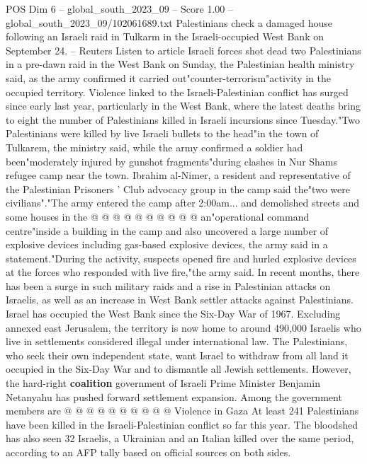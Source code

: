 \begin{textsample}{POS Dim 6 – global\_south\_2023\_09 – Score 1.00 – global\_south\_2023\_09/102061689.txt}  \label{ex:f6_pos_384}
Palestinians check a damaged house following an Israeli raid in Tulkarm in the Israeli-occupied West Bank on September 24. -- Reuters Listen to article Israeli forces shot dead two Palestinians in a pre-dawn raid in the West Bank on Sunday, the Palestinian health ministry said, as the army confirmed it carried out"counter-terrorism"activity in the occupied territory.
Violence linked to the Israeli-Palestinian conflict has surged since early last year, particularly in the West Bank, where the latest deaths bring to eight the number of Palestinians killed in Israeli incursions since Tuesday."Two Palestinians were killed by live Israeli bullets to the head"in the town of Tulkarem, the ministry said, while the army confirmed a soldier had been"moderately injured by gunshot fragments"during clashes in Nur Shams refugee camp near the town.
Ibrahim al-Nimer, a resident and representative of the Palestinian Prisoners ' Club advocacy group in the camp said the"two were civilians"."The army entered the camp after 2:00am... and demolished streets and some houses in the @ @ @ @ @ @ @ @ @ @ an"operational command centre"inside a building in the camp and also uncovered a large number of explosive devices including gas-based explosive devices, the army said in a statement."During the activity, suspects opened fire and hurled explosive devices at the forces who responded with live fire,"the army said.
In recent months, there has been a surge in such military raids and a rise in Palestinian attacks on Israelis, as well as an increase in West Bank settler attacks against Palestinians.
Israel has occupied the West Bank since the Six-Day War of 1967.
Excluding annexed east Jerusalem, the territory is now home to around 490,000 Israelis who live in settlements considered illegal under international law.
The Palestinians, who seek their own independent state, want Israel to withdraw from all land it occupied in the Six-Day War and to dismantle all Jewish settlements.
However, the hard-right \textbf{coalition} government of Israeli Prime Minister Benjamin Netanyahu has pushed forward settlement expansion.
Among the government members are @ @ @ @ @ @ @ @ @ @ Violence in Gaza At least 241 Palestinians have been killed in the Israeli-Palestinian conflict so far this year.
The bloodshed has also seen 32 Israelis, a Ukrainian and an Italian killed over the same period, according to an AFP tally based on official sources on both sides.

\end{textsample}
